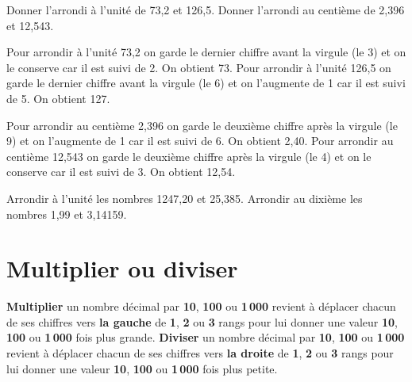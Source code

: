 \begin{methode*1}[Arrondir]

\begin{exemple*1}
Donner l'arrondi à l'unité de 73,2 et 126,5. Donner l'arrondi au centième de 2,396 et 12,543.

Pour arrondir à l'unité 73,2 on garde le dernier chiffre avant la virgule (le 3) et on le conserve car il est suivi de 2. On obtient 73. Pour arrondir à l'unité 126,5 on garde le dernier chiffre avant la virgule (le 6) et on l'augmente de 1 car il est suivi de 5. On obtient 127.

Pour arrondir au centième 2,396 on garde le deuxième chiffre après la virgule (le 9) et on l'augmente de 1 car il est suivi de 6. On obtient 2,40. Pour arrondir au centième 12,543 on garde le deuxième chiffre après la virgule (le 4) et on le conserve car il est suivi de 3. On obtient 12,54.
\end{exemple*1}

\exercice

Arrondir à l'unité les nombres 1247,20 et 25,385. Arrondir au dixième les nombres 1,99 et 3,14159.


\end{methode*1}


\section{Multiplier ou diviser}

\begin{aconnaitre}
\textbf{Multiplier} un nombre décimal par \textcolor{A1}{\textbf{10}}, \textcolor{B1}{\textbf{100}} ou \textcolor{J1}{\textbf{1\,000}} revient à déplacer chacun de ses chiffres vers \textbf{la gauche} de \textcolor{A1}{\textbf{1}}, \textcolor{B1}{\textbf{2}} ou \textcolor{J1}{\textbf{3}} rangs pour lui donner une valeur \textcolor{A1}{\textbf{10}}, \textcolor{B1}{\textbf{100}} ou \textcolor{J1}{\textbf{1\,000}} fois plus grande.
\textbf{Diviser} un nombre décimal par \textcolor{A1}{\textbf{10}}, \textcolor{B1}{\textbf{100}} ou \textcolor{J1}{\textbf{1\,000}} revient à déplacer chacun de ses chiffres vers \textbf{la droite} de \textcolor{A1}{\textbf{1}}, \textcolor{B1}{\textbf{2}} ou \textcolor{J1}{\textbf{3}} rangs pour lui donner une valeur  \textcolor{A1}{\textbf{10}}, \textcolor{B1}{\textbf{100}} ou \textcolor{J1}{\textbf{1\,000}} fois plus petite.
\end{aconnaitre}


